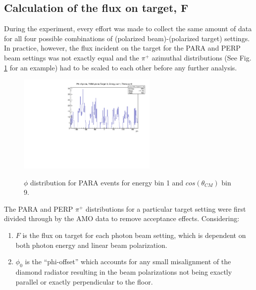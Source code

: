 \subsection{Calculation of the flux on target, F} \label{ch:flux}
During the experiment, every effort was made to collect the same amount of data for all four possible combinations of (polarized beam)-(polarized target) settings. In practice, however, the flux incident on the target for the PARA and PERP beam settings was not exactly equal and the $\pi^+$ azimuthal distributions (See Fig. \ref{fig:frost_PARA_ex} for an example) had to be scaled to each other before any further analysis.
\begin{figure}[H]
  \begin{center}
    \includegraphics[width=0.6\textwidth]{figures/phi_PARA.pdf} \\
    \caption{$\phi$ distribution for PARA events for energy bin 1 and $cos(\theta_{CM})$ bin 9. }
    \label{fig:frost_PARA_ex}
  \end{center}
\end{figure}



The PARA and PERP $\pi^+$ distributions for a particular target setting were first divided through by the AMO data to remove acceptance effects.
Considering:
\begin{enumerate}
  \item $F$ is the flux on target for each photon beam setting, which is dependent on both photon energy and linear beam polarization. 
  \item $\phi_0$ is the “phi-offset” which accounts for any small misalignment of the diamond radiator resulting in the beam polarizations not being exactly parallel or exactly perpendicular to the floor.
\end{enumerate}

